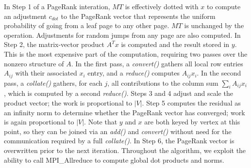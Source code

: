 In Step 1 of a PageRank interation, $MT$ is effectively dotted with
$x$ to compute an adjustment $c_{dot}$ to the PageRank vector that
represents the uniform probability of going from a leaf page to any
other page.  $MT$ is unchanged by the operation.  Adjustments for
random jumps from any page are also computed.  In Step 2, the
matrix-vector product $A^T x$ is computed and the result stored in
$y$.  This is the most expensive part of the computation, requiring
two passes over the nonzero structure of $A$.  In the first pass, a
{\it convert()} gathers all local row entries $A_{ij}$ with their
associated $x_i$ entry, and a {\it reduce()} computes $A_{ij} x_i$.
In the second pass, a {\it collate()} gathers, for each $j$, all
contributions to the column sum $\sum_i A_{ij} x_i$, which is computed
by a second {\it reduce()}.  Steps 3 and 4 adjust and scale the
product vector; the work is proportional to $|V|$.  Step 5 computes
the residual as an infinity norm to determine whether the PageRank
vector has converged; work is again proportional to $|V|$.  Note that
$y$ and $x$ are both keyed by vertex at this point, so they can be
joined via an {\it add()} and {\it convert()} without need for the
communication required by a full {\it collate()}.  In Step 6, the
PageRank vector is overwritten prior to the next iteration.
Throughout the algorithm, we exploit the ability to call
MPI\_Allreduce to compute global dot products and norms.

